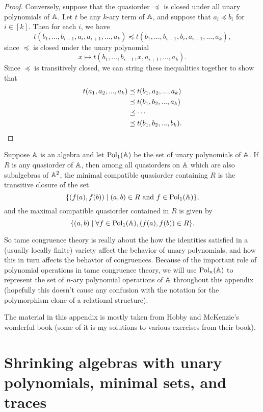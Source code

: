 \begin{appendices}
\begin{proof}
Conversely, suppose that the quasiorder $\preceq$ is closed under all unary polynomials of $\mathbb{A}$. Let $t$ be any $k$-ary term of $\mathbb{A}$, and suppose that $a_i \preceq b_i$ for $i \in [k]$. Then for each $i$, we have
\[
t(b_1, ..., b_{i-1}, a_i, a_{i+1}, ..., a_k) \preceq t(b_1, ..., b_{i-1}, b_i, a_{i+1}, ..., a_k),
\]
since $\preceq$ is closed under the unary polynomial
\[
x \mapsto t(b_1, ..., b_{i-1}, x, a_{i+1}, ..., a_k).
\]
Since $\preceq$ is transitively closed, we can string these inequalities together to show that
\begin{align*}
t(a_1, a_2, ..., a_k) &\preceq t(b_1, a_2, ..., a_k)\\
&\preceq t(b_1, b_2, ..., a_k)\\
&\preceq \cdots\\
&\preceq t(b_1, b_2, ..., b_k).\qedhere
\end{align*}
\end{proof}

\begin{cor}\label{cor-quasiorder-poly} Suppose $\mathbb{A}$ is an algebra and let $\operatorname{Pol}_1(\mathbb{A})$ be the set of unary polynomials of $\mathbb{A}$. If $R$ is any quasiorder of $\mathbb{A}$, then among all quasiorders on $\mathbb{A}$ which are also subalgebras of $\mathbb{A}^2$, the minimal compatible quasiorder containing $R$ is the transitive closure of the set
\[
\{(f(a), f(b)) \mid (a,b) \in R \text{ and } f \in \operatorname{Pol}_1(\mathbb{A})\},
\]
and the maximal compatible quasiorder contained in $R$ is given by
\[
\{(a,b) \mid \forall f \in \operatorname{Pol}_1(\mathbb{A}), (f(a), f(b)) \in R\}.
\]
\end{cor}

So tame congruence theory is really about the how the identities satisfied in a (usually locally finite) variety affect the behavior of unary polynomials, and how this in turn affects the behavior of congruences. Because of the important role of polynomial operations in tame congruence theory, we will use $\operatorname{Pol}_n(\mathbb{A})$ to represent the set of $n$-ary polynomial operations of $\mathbb{A}$ throughout this appendix (hopefully this doesn't cause any confusion with the notation for the polymorphism clone of a relational structure).

The material in this appendix is mostly taken from Hobby and McKenzie's wonderful book \cite{hobby-mckenzie} (some of it is my solutions to various exercises from their book).


\section{Shrinking algebras with unary polynomials, minimal sets, and traces}


\end{appendices}
